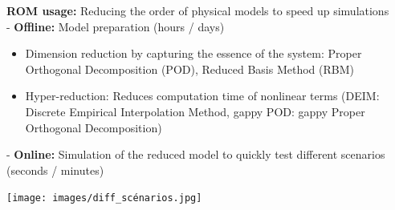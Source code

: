 \documentclass{beamer}
\begin{document}
\begin{frame}
    \small
    \textbf{ROM usage:} Reducing the order of physical models to speed up simulations  \\
    \vspace{0.2cm}
    - \textbf{Offline:} Model preparation (hours / days)
    \begin{itemize}
        \item Dimension reduction by capturing the essence of the system: Proper Orthogonal Decomposition (POD), Reduced Basis Method (RBM)
        \item Hyper-reduction: Reduces computation time of nonlinear terms (DEIM: Discrete Empirical Interpolation Method, gappy POD: gappy Proper Orthogonal Decomposition) %
    \end{itemize}
    \vspace{0.2cm}
    - \textbf{Online:} Simulation of the reduced model to quickly test different scenarios (seconds / minutes)
    \vspace{-0.4cm}
    \begin{flushright}
        \texttt{[image: images/diff\_scénarios.jpg]}
    \end{flushright}
\end{frame}
\end{document}
